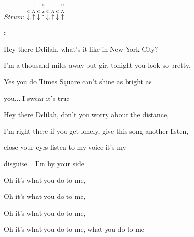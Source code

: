 \begin{song}


\begin{strumbox}
\textit{Strum:} $\PluckDown{C}\PluckUp{E \\ A}\PluckDown{C}\PluckUp{E \\ A}\PluckDown{C}\PluckUp{E \\ A}\PluckDown{C}\PluckUp{E \\ A}$
\end{strumbox}

\begin{chordbox}
\vspace{2em}
\par
{}\par
{}\par
{}\par
{}\par
\end{chordbox}

\bigskip

\Intro\textbf{:}     \par

\bigskip

 Hey there Delilah, what's it like in New York City? \par
I'm a thousand miles away but girl tonight you look so pretty, \par
Yes you do  Times Square can't shine as bright as \par
{}you... I swear it's true \par

\bigskip

 Hey there Delilah, don't you worry about the distance, \par
I'm right there if you get lonely, give this song another listen, \par
close your eyes listen to my voice it's my \par
disguise... I'm by your side \par

\bigskip

\begin{chorusbox}{\Chorus}
Oh it's what you do to me, \par
{}Oh it's what you do to me, \par
{}Oh it's what you do to me, \par
{}Oh it's what you do to me, what you  do to me \par
\end{chorusbox}


\end{song}
